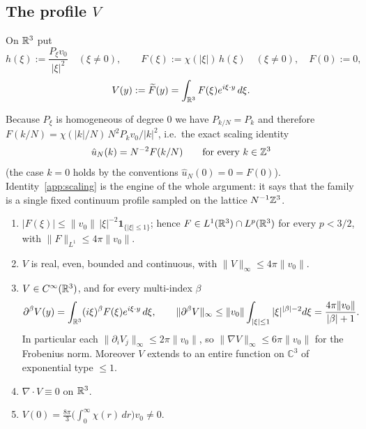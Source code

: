 \subsection{The profile $V$}
\label{app:profile}

\begin{definition}\label{app:Vdef}
On $\mathbb R^3$ put
\[
h(\xi):=\frac{P_\xi v_0}{|\xi|^2}\quad(\xi\neq0),\qquad
F(\xi):=\chi(|\xi|)\,h(\xi)\quad(\xi\neq0),\quad F(0):=0,
\]
\[
V(y):=\widetilde F(y)=\int_{\mathbb R^3}F(\xi)e^{i\xi\cdot y}\,d\xi .
\]
\end{definition}

Because $P_\xi$ is homogeneous of degree $0$ we have
$P_{k/N}=P_k$ and therefore
$F(k/N)=\chi(|k|/N)\,N^2P_kv_0/|k|^2$, i.e.\ the exact scaling identity
\begin{equation}\label{app:scaling}
\hat u_N(k)=N^{-2}F(k/N)\qquad\text{for every }k\in\mathbb Z^3
\end{equation}
(the case $k=0$ holds by the conventions $\hat u_N(0)=0=F(0)$).
Identity~\eqref{app:scaling} is the engine of the whole argument: it
says that the family is a single fixed continuum profile sampled on the
lattice $N^{-1}\mathbb Z^3$.

\begin{theorem}\label{app:Vprops}
\begin{enumerate}
\item[(1)] $|F(\xi)|\le\|v_0\|\,|\xi|^{-2}\mathbf 1_{\{|\xi|\le1\}}$;
hence $F\in L^1(\mathbb R^3)\cap L^p(\mathbb R^3)$ for every $p<3/2$, with
$\|F\|_{L^1}\le4\pi\|v_0\|$.
\item[(2)] $V$ is real, even, bounded and continuous, with
$\|V\|_\infty\le4\pi\|v_0\|$.
\item[(3)] $V\in C^\infty(\mathbb R^3)$, and for every multi-index $\beta$
\[
\partial^\beta V(y)=\int_{\mathbb R^3}(i\xi)^\beta F(\xi)e^{i\xi\cdot y}\,d\xi,
\qquad
\|\partial^\beta V\|_\infty\le\|v_0\|\int_{|\xi|\le1}|\xi|^{|\beta|-2}d\xi
=\frac{4\pi\|v_0\|}{|\beta|+1} .
\]
In particular each $\|\partial_iV_j\|_\infty\le2\pi\|v_0\|$, so
$\|\nabla V\|_\infty\le6\pi\|v_0\|$ for the Frobenius norm. Moreover $V$
extends to an entire function on $\mathbb C^3$ of exponential type
$\le1$.
\item[(4)] $\nabla\cdot V\equiv0$ on $\mathbb R^3$.
\item[(5)] $V(0)=\frac{8\pi}{3}\big(\int_0^\infty\chi(r)\,dr\big)v_0\neq0$.
\end{enumerate}
\end{theorem}

